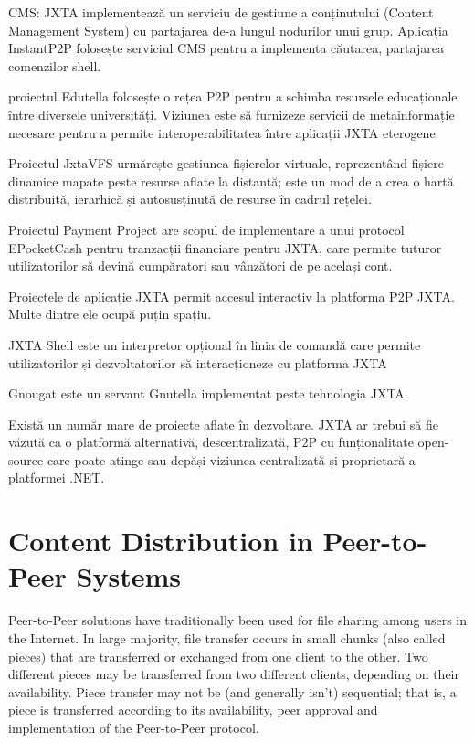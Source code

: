 CMS: JXTA implementează un serviciu de gestiune a conținutului (Content
Management System) cu partajarea de-a lungul nodurilor unui grup. Aplicația
InstantP2P folosește serviciul CMS pentru a implementa căutarea, partajarea
comenzilor shell.

proiectul Edutella folosește o rețea P2P pentru a schimba resursele
educaționale între diversele universități. Viziunea este să furnizeze servicii
de metainformație necesare pentru a permite interoperabilitatea între
aplicații JXTA eterogene.

Proiectul JxtaVFS urmărește gestiunea fișierelor virtuale, reprezentând
fișiere dinamice mapate peste resurse aflate la distanță; este un mod de a
crea o hartă distribuită, ierarhică și autosusținută de resurse în cadrul
rețelei.

Proiectul Payment Project are scopul de implementare a unui protocol
EPocketCash pentru tranzacții financiare pentru JXTA, care permite tuturor
utilizatorilor să devină cumpăratori sau vânzători de pe același cont.

Proiectele de aplicație JXTA permit accesul interactiv la platforma P2P JXTA.
Multe dintre ele ocupă puțin spațiu.

JXTA Shell este un interpretor opțional în linia de comandă care permite
utilizatorilor și dezvoltatorilor să interacționeze cu platforma JXTA

Gnougat este un servant Gnutella implementat peste tehnologia JXTA.

Există un număr mare de proiecte aflate în dezvoltare. JXTA ar trebui să fie
văzută ca o platformă alternativă, descentralizată, P2P cu funționalitate
open-source care poate atinge sau depăși viziunea centralizată și proprietară
a platformei .NET.

\section{Content Distribution in Peer-to-Peer Systems}
\label{sec:p2p-systems:streaming}

Peer-to-Peer solutions have traditionally been used for file sharing among
users in the Internet. In large majority, file transfer occurs in small
chunks (also called pieces) that are transferred or exchanged from one client
to the other. Two different pieces may be transferred from two different
clients, depending on their availability. Piece transfer may not be (and
generally isn't) sequential; that is, a piece is transferred according to its
availability, peer approval and implementation of the Peer-to-Peer protocol.

